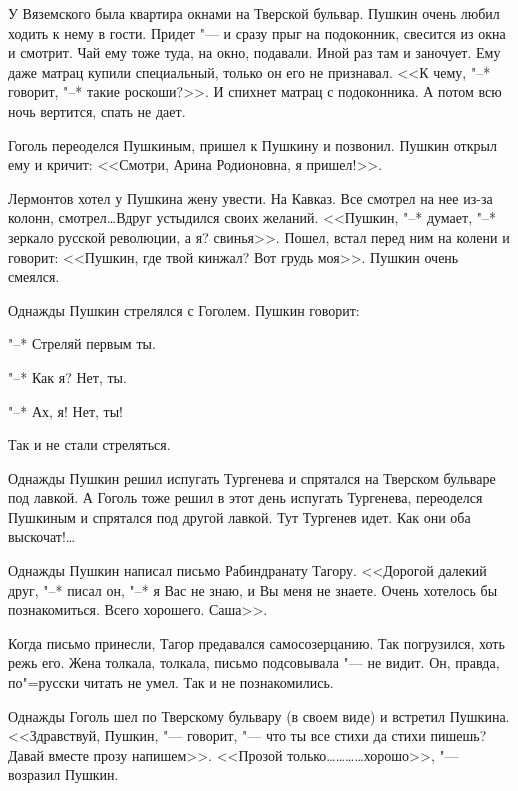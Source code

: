 У Вяземского была квартира окнами на Тверской бульвар. Пушкин очень любил ходить
к нему в гости. Придет "--- и сразу прыг на подоконник, свесится из окна и 
смотрит. Чай ему тоже туда, на окно, подавали. Иной раз там и заночует. Ему 
даже матрац купили специальный, только он его не признавал. <<К чему, "--* 
говорит, "--* такие роскоши?>>. И спихнет матрац с подоконника. А потом всю 
ночь вертится, спать не дает.

Гоголь переоделся Пушкиным, пришел к Пушкину и позвонил. Пушкин открыл ему и 
кричит: <<Смотри, Арина Родионовна, я пришел!>>.

Лермонтов хотел у Пушкина жену увести. На Кавказ. Все смотрел на нее из-за
колонн, смотрел\dots Вдруг устыдился своих желаний. <<Пушкин, "--* думает, "--*
зеркало русской революции, а я? свинья>>. Пошел, встал перед ним на колени и 
говорит: <<Пушкин, где твой кинжал? Вот грудь моя>>. Пушкин очень смеялся.

Однажды Пушкин стрелялся с Гоголем. Пушкин говорит:

"--* Стреляй первым ты.

"--* Как я? Нет, ты.

"--* Ах, я! Нет, ты!

Так и не стали стреляться.

Однажды Пушкин решил испугать Тургенева и спрятался на Тверском бульваре под 
лавкой. А Гоголь тоже решил в этот день испугать Тургенева, переоделся Пушкиным 
и спрятался под другой лавкой. Тут Тургенев идет. Как они оба выскочат!\dots

Однажды Пушкин написал письмо Рабиндранату Тагору. <<Дорогой далекий друг, "--*
писал он, "--* я Вас не знаю, и Вы меня не знаете. Очень хотелось бы 
познакомиться. Всего хорошего. Саша>>.

Когда письмо принесли, Тагор предавался самосозерцанию. Так погрузился, хоть 
режь его. Жена толкала, толкала, письмо подсовывала "--- не видит. Он, правда, 
по"=русски читать не умел. Так и не познакомились.

Однажды Гоголь шел по Тверскому бульвару (в своем виде) и встретил Пушкина. 
<<Здравствуй, Пушкин, "--- говорит, "--- что ты все стихи да стихи пишешь? Давай
вместе прозу напишем>>. <<Прозой только\dots\dots\dots\dots хорошо>>, "--- 
возразил Пушкин.